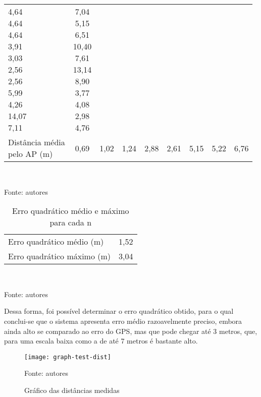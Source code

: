 \begin{table}[ht]
\begin{tabular}{l|cccccccc}
\makecell{4,64 \\ 4,64 \\ 4,64 \\ 3,91 \\ 3,03 \\ 2,56 \\ 2,56 \\ 5,99 \\ 4,26 \\ 14,07 \\ 7,11} &
\makecell{7,04 \\ 5,15 \\ 6,51 \\ 10,40 \\ 7,61 \\ 13,14 \\ 8,90 \\ 3,77 \\ 4,08 \\ 2,98 \\ 4,76}
\vspace{0.4cm}\\

\makecell{Distância média \\ pelo AP (m)} & 0,69 & 1,02 & 1,24 & 2,88 & 2,61 & 5,15 & 5,22 & 6,76
\end{tabular}
\vspace{0.4cm}\\
\centerline{\small{Fonte: autores}}
\end{table}

\begin{table}[ht]
\centering
\caption{Erro quadrático médio e máximo para cada n}
\vspace{0.5cm}
\begin{tabular}{l|c}
\hline
Erro quadrático médio (m) & 1,52 \vspace{0.4cm}\\
Erro quadrático máximo (m) & 3,04
\end{tabular}
\vspace{0.4cm}\\
\centerline{\small{Fonte: autores}}
\end{table}

Dessa forma, foi possível determinar o erro quadrático obtido, para o qual conclui-se que o sistema apresenta erro médio razoavelmente preciso, embora ainda alto se comparado ao erro do GPS, mas que pode chegar até 3 metros, que, para uma escala baixa como a de até 7 metros é bastante alto.

\begin{figure}[ht]
  \centering
    \caption{Gráfico das distâncias medidas}
    \texttt{[image: graph-test-dist]}
  \centerline{\small{Fonte: autores}}
\end{figure}

